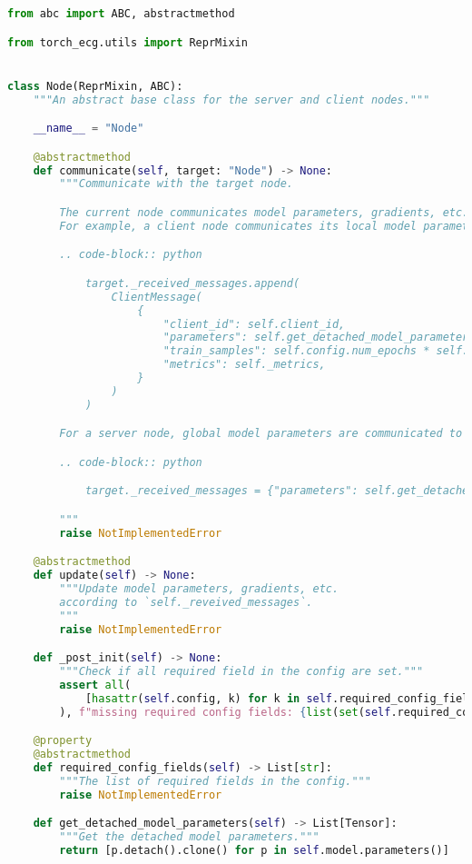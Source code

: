 \begin{lstlisting}[language=Python, caption=基类\texttt{Node}的Python代码,label={lst:node}]
from abc import ABC, abstractmethod

from torch_ecg.utils import ReprMixin


class Node(ReprMixin, ABC):
    """An abstract base class for the server and client nodes."""

    __name__ = "Node"

    @abstractmethod
    def communicate(self, target: "Node") -> None:
        """Communicate with the target node.

        The current node communicates model parameters, gradients, etc. to `target` node.
        For example, a client node communicates its local model parameters to server node via

        .. code-block:: python

            target._received_messages.append(
                ClientMessage(
                    {
                        "client_id": self.client_id,
                        "parameters": self.get_detached_model_parameters(),
                        "train_samples": self.config.num_epochs * self.config.num_steps * self.config.batch_size,
                        "metrics": self._metrics,
                    }
                )
            )

        For a server node, global model parameters are communicated to clients via

        .. code-block:: python

            target._received_messages = {"parameters": self.get_detached_model_parameters()}

        """
        raise NotImplementedError

    @abstractmethod
    def update(self) -> None:
        """Update model parameters, gradients, etc.
        according to `self._reveived_messages`.
        """
        raise NotImplementedError

    def _post_init(self) -> None:
        """Check if all required field in the config are set."""
        assert all(
            [hasattr(self.config, k) for k in self.required_config_fields]
        ), f"missing required config fields: {list(set(self.required_config_fields) - set(self.config.__dict__))}"

    @property
    @abstractmethod
    def required_config_fields(self) -> List[str]:
        """The list of required fields in the config."""
        raise NotImplementedError

    def get_detached_model_parameters(self) -> List[Tensor]:
        """Get the detached model parameters."""
        return [p.detach().clone() for p in self.model.parameters()]
\end{lstlisting}

